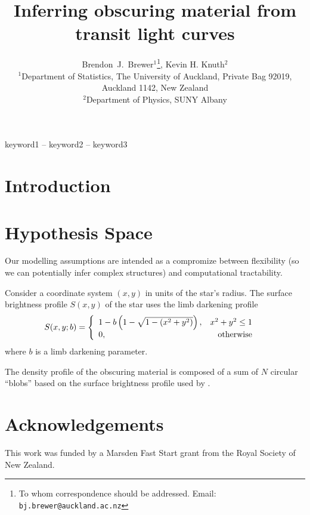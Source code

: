 \documentclass[a4paper,fleqn,usenatbib]{mnras}
\title[]
{Inferring obscuring material from transit light curves}
\author[Brewer and Knuth]{%
  Brendon~J.~Brewer$^{1}$\thanks{To whom correspondence should be addressed. Email: {\tt bj.brewer@auckland.ac.nz}},
  Kevin H. Knuth$^2$
  \medskip\\
  $^1$Department of Statistics, The University of Auckland, Private Bag 92019, Auckland 1142, New Zealand\\
  $^2$Department of Physics, SUNY Albany}
\date{}
\begin{document}
\label{firstpage}
\pagerange{\pageref{firstpage}--\pageref{lastpage}}
\maketitle

\begin{abstract}
\end{abstract}

\begin{keywords}
keyword1 -- keyword2 -- keyword3
\end{keywords}



\section{Introduction}


\section{Hypothesis Space}
Our modelling assumptions are intended as a compromize between flexibility
(so we can potentially infer complex structures) and computational
tractability.

Consider a coordinate system $(x,y)$ in units of the star's radius.
The surface brightness profile
$S(x, y)$ of the star uses the limb darkening profile
\begin{align}
S(x, y; b) &=
    \left\{
        \begin{array}{lr}
            1 - b\left(1 - \sqrt{1 - (x^2 + y^2)}\right),   & x^2+y^2 \leq 1\\
            0, & \textnormal{otherwise}
        \end{array}
    \right.
\end{align}
where $b$ is a limb darkening parameter.

The density profile of the obscuring material is composed of a sum of
$N$ circular ``blobs'' based on the surface brightness profile
used by \citet{lensing2}.



\section*{Acknowledgements}
This work was funded by a Marsden Fast Start grant from the Royal Society of
New Zealand.
\end{document}

